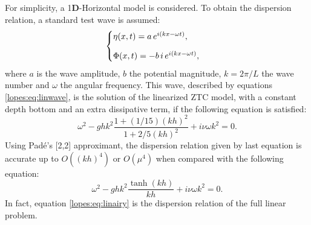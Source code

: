 For simplicity,  a 1{\bf D}-Horizontal  model is  considered. 
To obtain the dispersion relation, 
a standard  test  wave is assumed:
\begin{equation}\label{lopes:eq:linwave}
\begin{cases}
\eta(x,t)=a\,e^{i(kx-\omega t)},\vspace{0.3cm}\\
\Phi(x,t)=-b\,i\,e^{i(kx-\omega t)}, 
\end{cases}
\end{equation}
where \(a\) is the wave amplitude,  \(b\) the potential
magnitude, \(k=2\pi/L\) the wave number and \(\omega\) the angular frequency.
This wave, described by equations \eqref{lopes:eq:linwave}, is the
solution of the linearized  ZTC model, with a constant depth
bottom and an extra dissipative term, 
 if the following equation is satisfied:
\begin{equation}\label{lopes:eq:dissdisp}
\omega^2-ghk^2\frac{1+(1/15)(kh)^2}{1+2/5(kh)^2}+i\nu\omega k^2=0.
\end{equation}
Using Pad\'{e}'s [2,2] approximant,  the dispersion relation
given by last equation  is accurate up to \(O((kh)^4)\) or \(O(\mu^4)\) when
compared with the following equation:
\begin{equation}\label{lopes:eq:linairy}
\omega^2-ghk^2\frac{\tanh(kh)}{kh}+i\nu\omega k^2=0.
\end{equation}
In  fact, equation \eqref{lopes:eq:linairy} is the dispersion 
relation of the full linear problem.

